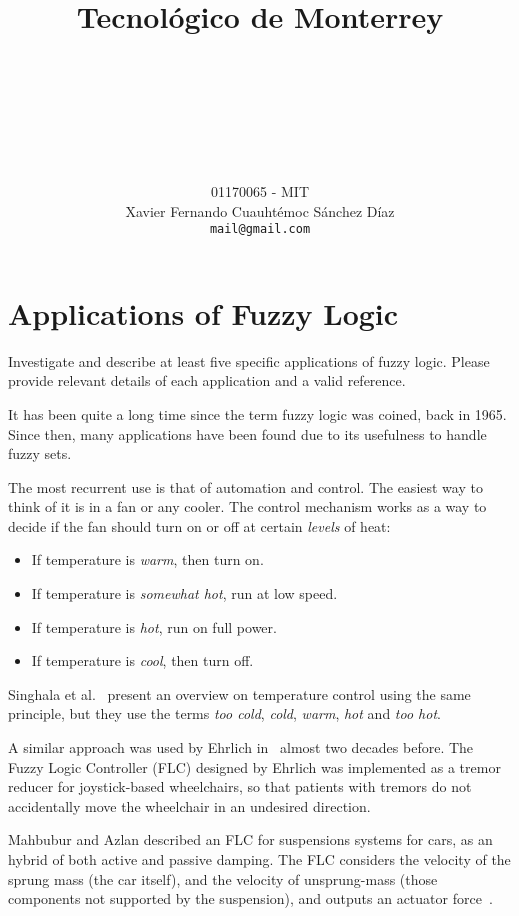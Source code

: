 \documentclass[titlepage, letterpaper, fleqn]{article}
\title{
\vspace{1in}
\textbf{Tecnológico de Monterrey} \\
\vspace{0.5in}
\textmd{\mahclass} \\
\vspace{0.5in}
\large{\textit{\mahteacher}} \\
\vspace{0.5in}
\textsc{\mahtitle}\\
\author{01170065  - MIT \\
Xavier Fernando Cuauhtémoc Sánchez Díaz \\
\texttt{mail@gmail.com}}
\date{\mahdate}
}
\newcommand{\spacepls}{\vspace{5mm}}
\begin{document}
\begin{titlepage}
\maketitle
\end{titlepage}

%
%

\section{Applications of Fuzzy Logic}

{\large Investigate and describe at least five specific applications of fuzzy logic.
Please provide relevant details of each application and a valid reference.}

\spacepls

It has been quite a long time since the term fuzzy logic was coined, back in 1965.
Since then, many applications have been found due to its usefulness to handle fuzzy sets.

The most recurrent use is that of automation and control.
The easiest way to think of it is in a fan or any cooler.
The control mechanism works as a way to decide if the fan should turn on or off at certain \textit{levels} of heat:
\begin{itemize}
  \item If temperature is \textit{warm}, then turn on.
  \item If temperature is \textit{somewhat hot}, run at low speed.
  \item If temperature is \textit{hot}, run on full power.
  \item If temperature is \textit{cool}, then turn off.
\end{itemize}

Singhala et al.~\cite{Singhala14} present an overview on temperature control using the same principle, but they use the terms \textit{too cold}, \textit{cold}, \textit{warm}, \textit{hot} and \textit{too hot}.

A similar approach was used by Ehrlich in~\cite{Ehrlich95} almost two decades before.
The Fuzzy Logic Controller (FLC) designed by Ehrlich was implemented as a tremor reducer for joystick-based wheelchairs, so that patients with tremors do not accidentally move the wheelchair in an undesired direction.

Mahbubur and Azlan described an FLC for suspensions systems for cars, as an hybrid of both active and passive damping.
The FLC considers the velocity of the sprung mass (the car itself), and the velocity of unsprung-mass (those components not supported by the suspension), and outputs an actuator force~\cite{Mahbubur12}.
\end{document}
